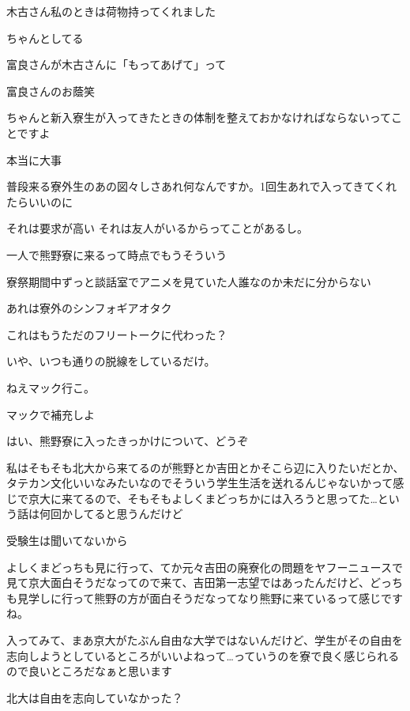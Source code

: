 \begin{multicols}{3}
木古さん私のときは荷物持ってくれました

ちゃんとしてる

富良さんが木古さんに「もってあげて」って

富良さんのお蔭笑

ちゃんと新入寮生が入ってきたときの体制を整えておかなければならないってことですよ

本当に大事

普段来る寮外生のあの図々しさあれ何なんですか。1回生あれで入ってきてくれたらいいのに

それは要求が高い それは友人がいるからってことがあるし。

一人で熊野寮に来るって時点でもうそういう

寮祭期間中ずっと談話室でアニメを見ていた人誰なのか未だに分からない

あれは寮外のシンフォギアオタク

これはもうただのフリートークに代わった？

いや、いつも通りの脱線をしているだけ。

ねえマック行こ。

マックで補充しよ

\vspace{5mm}


\noindent{}

はい、熊野寮に入ったきっかけについて、どうぞ

私はそもそも北大から来てるのが熊野とか吉田とかそこら辺に入りたいだとか、タテカン文化いいなみたいなのでそういう学生生活を送れるんじゃないかって感じで京大に来てるので、そもそもよしくまどっちかには入ろうと思ってた…という話は何回かしてると思うんだけど

受験生は聞いてないから

よしくまどっちも見に行って、てか元々吉田の廃寮化の問題をヤフーニュースで見て京大面白そうだなってので来て、吉田第一志望ではあったんだけど、どっちも見学しに行って熊野の方が面白そうだなってなり熊野に来ているって感じですね。

入ってみて、まあ京大がたぶん自由な大学ではないんだけど、学生がその自由を志向しようとしているところがいいよねって…っていうのを寮で良く感じられるので良いところだなぁと思います

北大は自由を志向していなかった？


\end{multicols}
